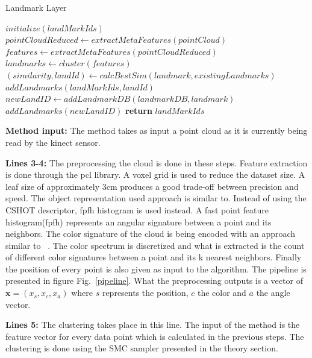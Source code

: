 \documentclass[]{article}
\begin{document}
    \begin{algorithm}
        \caption{Landmark Layer}\label{euclid}
        \begin{algorithmic}[1]
            \State $initialize(landMarkIds)$
            \State $pointCloudReduced \gets extractMetaFeatures(pointCloud)$ 
            \State $features \gets extractMetaFeatures(pointCloudReduced)$
            \State $landmarks \gets cluster(features)$  
            \State $ (similarity, landId) \gets calcBestSim(landmark, existingLandmarks) $
            \State $ addLandmarks(landMarkIds, landId)$
            \Else 
            \State $ newLandID \gets addLandmarkDB(landmarkDB, landmark)$
            \State $addLandmarks(newLandID)$
            \EndIf
            \EndFor
            \State \textbf{return} $ landMarkIds$
            \EndProcedure
        \end{algorithmic}
    \end{algorithm}


    \textbf{Method input:} The method takes as input a point cloud as it is currently being read by the kinect sensor.

    \textbf{Lines 3-4:} The preprocessing the cloud is done in these steps. Feature extraction is done through the pcl\cite{pcl} library. A voxel grid is used to reduce the dataset size. A leaf size of approximately 3cm produces a good trade-off between precision and speed. The object representation used approach is similar to\cite{objectpointslam}. Instead of using the CSHOT descriptor, fpfh\cite{fpfh} histogram is used instead. A fast point feature histogram(fpfh) represents an angular signature between a point and its neighbors. The color signature of the cloud is being encoded with an approach similar to ~\cite{smcddp}. The color spectrum is discretized and what is extracted is the count of different color signatures between a point and its k nearest neighbors. Finally the position of every point is also given as input to the algorithm. The pipeline is presented in figure Fig.~\ref{pipeline}. What the preprocessing outputs is a vector of $\textbf{x} =(x_s, x_c, x_a)$ where $s$ represents the position, $c$ the color and $a$ the angle vector.

    \textbf{Lines 5:} The clustering takes place in this line. The input of the method is the feature vector for every data point which is calculated in the previous steps. The clustering is done using the SMC sampler presented in the theory section. 
\end{document}
